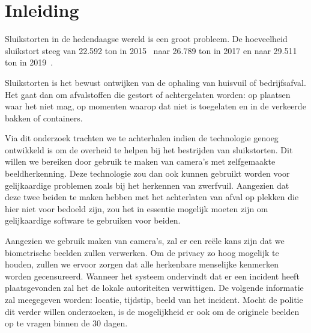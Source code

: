 \documentclass{hogent-article}
\affiliation{
  \textsuperscript{1} \href{mailto:mehmet.karademir@student.hogent.be}{mehmet.karademir@student.hogent.be}}
\affiliation{
  \textsuperscript{2} \href{mailto:nermin.dubinovic@student.hogent.be}{nermin.dubinovic@student.hogent.be}
}
\begin{document}
\flushbottom %
\maketitle %
\tableofcontents %
\thispagestyle{empty} %


\section{Inleiding}


Sluikstorten in de hedendaagse wereld is een groot probleem. De hoeveelheid sluikstort steeg van 22.592 ton in 2015~\autocite{Bilsen2018} naar 26.789 ton in 2017 en naar 29.511 ton in 2019~\autocite{Wolf2020}.

Sluikstorten is het bewust ontwijken van de ophaling van huisvuil of bedrijfsafval. Het gaat dan om afvalstoffen die gestort of achtergelaten worden: op plaatsen waar het niet mag, op momenten waarop dat niet is toegelaten en in de verkeerde bakken of containers.

Via dit onderzoek trachten we te achterhalen indien de technologie genoeg ontwikkeld is om de overheid te helpen bij het bestrijden van sluikstorten. Dit willen we bereiken door gebruik te maken van camera’s met zelfgemaakte beeldherkenning.
Deze technologie zou dan ook kunnen gebruikt worden voor gelijkaardige problemen zoals bij het herkennen van zwerfvuil. Aangezien dat deze twee beiden te maken hebben met het achterlaten van afval op plekken die hier niet voor bedoeld zijn, zou het in essentie mogelijk moeten zijn om gelijkaardige software te gebruiken voor beiden.

Aangezien we gebruik maken van camera’s, zal er een reële kans zijn dat we biometrische beelden zullen verwerken. Om de privacy zo hoog mogelijk te houden, zullen we ervoor zorgen dat alle herkenbare menselijke kenmerken worden gecensureerd.
Wanneer het systeem ondervindt dat er een incident heeft plaatsgevonden zal het de lokale autoriteiten verwittigen. De volgende informatie zal meegegeven worden: locatie, tijdstip, beeld van het incident. Mocht de politie dit verder willen onderzoeken, is de mogelijkheid er ook om de originele beelden op te vragen binnen de 30 dagen.
\end{document}

